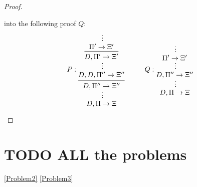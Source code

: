 \documentclass[11pt]{article}
\begin{document}
\begin{enumerate}
\begin{proof}
\begin{enumerate}
into the following proof \(Q\):
\begin{equation*}
P:
\begin{prooftree}%
\hypo{}
\ellipsis{}{\Pi'\to\Xi'}
\infer1{D,\Pi'\to\Xi'}
\ellipsis{}{D,D,\Pi''\to\Xi''}
\infer1{D,\Pi''\to\Xi''}
\ellipsis{}{D,\Pi\to\Xi}
\end{prooftree}\hspace{1cm}
Q:
\begin{prooftree}%
\hypo{}
\ellipsis{}{\Pi'\to\Xi'}
\ellipsis{}{D,\Pi''\to\Xi''}
\ellipsis{}{D,\Pi\to\Xi}
\end{prooftree}
\end{equation*}
\end{enumerate}
\end{proof}
\end{enumerate}

\section{{\bfseries\sffamily TODO} ALL the problems}
\label{sec:org56d9e12}

\ref{Problem2}
\ref{Problem3}
\end{document}
